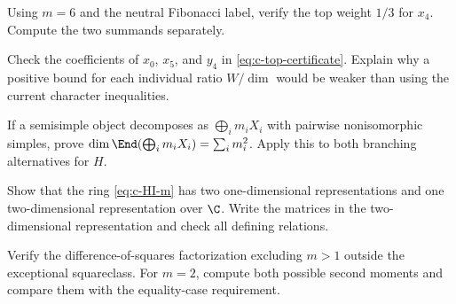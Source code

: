 \begin{exercise}\label{ex:c-branch-1}
Using $m=6$ and the neutral Fibonacci label, verify the top weight
$1/3$ for $x_4$. Compute the two summands separately.

\par\smallskip{}\par
\end{exercise}
\begin{exercise}\label{ex:c-branch-2}
Check the coefficients of $x_0$, $x_5$, and $y_4$ in
\eqref{eq:c-top-certificate}. Explain why a positive bound for each
individual ratio $W/\dim$ would be weaker than using the current
character inequalities.

\par\smallskip{}\par
\end{exercise}
\begin{exercise}\label{ex:c-branch-3}
If a semisimple object decomposes as $\bigoplus_i m_iX_i$ with
pairwise nonisomorphic simples, prove
$\dim\End(\bigoplus_i m_iX_i)=\sum_i m_i^2$.
Apply this to both branching alternatives for $H$.

\par\smallskip{}\par
\end{exercise}
\begin{exercise}\label{ex:c-branch-4}
Show that the ring \eqref{eq:c-HI-m} has two one-dimensional
representations and one two-dimensional representation over $\C$.
Write the matrices in the two-dimensional representation and check
all defining relations.

\par\smallskip{}\par
\end{exercise}
\begin{exercise}\label{ex:c-branch-5}
Verify the difference-of-squares factorization excluding $m>1$ outside
the exceptional squareclass. For $m=2$, compute both possible second
moments and compare them with the equality-case requirement.

\par\smallskip{}\par
\end{exercise}
